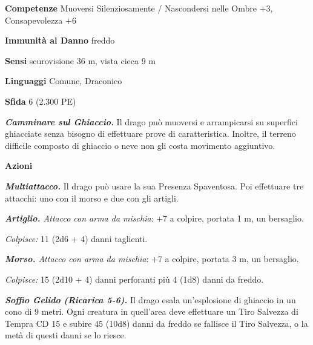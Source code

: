 \begin{multicols}{2}
\textbf{Competenze} Muoversi Silenziosamente / Nascondersi nelle Ombre +3, Consapevolezza +6

\textbf{Immunità al Danno} freddo

\textbf{Sensi} scurovisione 36 m, vista cieca 9 m

\textbf{Linguaggi} Comune, Draconico

\textbf{Sfida} 6 (2.300 PE)

\emph{\textbf{Camminare sul Ghiaccio.}} Il drago può muoversi e arrampicarsi su superfici ghiacciate senza bisogno di effettuare prove di caratteristica. Inoltre, il terreno difficile composto di ghiaccio o neve non gli costa movimento aggiuntivo.

\textbf{Azioni}

\emph{\textbf{Multiattacco.}} Il drago può usare la sua Presenza Spaventosa. Poi effettuare tre attacchi: uno con il morso e due con gli artigli.

\emph{\textbf{Artiglio.} Attacco con arma da mischia}: +7 a colpire, portata 1 m, un bersaglio.

\emph{Colpisce:} 11 (2d6 + 4) danni taglienti.

\emph{\textbf{Morso.} Attacco con arma da mischia}: +7 a colpire, portata 3 m, un bersaglio.

\emph{Colpisce:} 15 (2d10 + 4) danni perforanti più 4 (1d8) danni da freddo.

\emph{\textbf{Soffio Gelido (Ricarica 5-6).}} Il drago esala un'esplosione di ghiaccio in un cono di 9 metri. Ogni creatura in quell'area deve effettuare un Tiro Salvezza di Tempra CD 15 e subire 45 (10d8) danni da freddo se fallisce il Tiro Salvezza, o la metà di questi danni se lo riesce.


\end{multicols}
